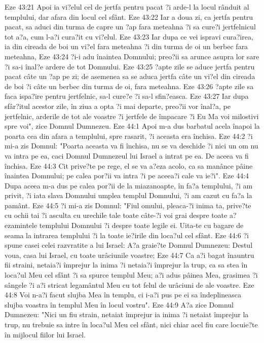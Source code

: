 Eze 43:21  Apoi ia vi?elul cel de jertfa pentru pacat ?i arde-l la locul rânduit al templului, dar afara din locul cel sfânt.
Eze 43:22  Iar a doua zi, ca jertfa pentru pacat, sa aduci din turma de capre un ?ap fara meteahna ?i sa cure?i jertfelnicul tot a?a, cum l-a?i cura?it cu vi?elul.
Eze 43:23  Iar dupa ce vei ispravi cura?irea, ia din cireada de boi un vi?el fara meteahna ?i din turma de oi un berbec fara meteahna,
Eze 43:24  ?i-i adu înaintea Domnului; preo?ii sa arunce asupra lor sare ?i sa-i înal?e ardere de tot Domnului.
Eze 43:25  ?apte zile se aduce jertfa pentru pacat câte un ?ap pe zi; de asemenea sa se aduca jertfa câte un vi?el din cireada de boi ?i câte un berbec din turma de oi, fara meteahna.
Eze 43:26  ?apte zile sa faca ispa?ire pentru jertfelnic, sa-l cure?e ?i sa-l sfin?easca.
Eze 43:27  Iar dupa sfâr?itul acestor zile, în ziua a opta ?i mai departe, preo?ii vor înal?a, pe jertfelnic, arderile de tot ale voastre ?i jertfele de împacare ?i Eu Ma voi milostivi spre voi", zice Domnul Dumnezeu.
Eze 44:1  Apoi m-a dus barbatul acela înapoi la poarta cea din afara a templului, spre rasarit, ?i aceasta era închisa.
Eze 44:2  ?i mi-a zis Domnul: "Poarta aceasta va fi închisa, nu se va deschide ?i nici un om nu va intra pe ea, caci Domnul Dumnezeul lui Israel a intrat pe ea. De aceea va fi închisa.
Eze 44:3  Cit prive?te pe rege, el se va a?eza acolo, ca sa manânce pâine înaintea Domnului; pe calea por?ii va intra ?i pe aceea?i cale va ie?i".
Eze 44:4  Dupa aceea m-a dus pe calea por?ii de la miazanoapte, în fa?a templului, ?i am privit, ?i iata slava Domnului umplea templul Domnului, ?i am cazut cu fa?a la pamânt.
Eze 44:5  ?i mi-a zis Domnul: "Fiul omului, pleaca-?i inima ta, prive?te cu ochii tai ?i asculta cu urechile tale toate câte-?i voi grai despre toate a?ezamintele templului Domnului ?i despre toate legile ei. Uita-te cu bagare de seama la intrarea templului ?i la toate ie?irile din loca?ul cel sfânt.
Eze 44:6  ?i spune casei celei razvratite a lui Israel: A?a graie?te Domnul Dumnezeu: Destul voua, casa lui Israel, cu toate urâciunile voastre;
Eze 44:7  Ca a?i bagat înauntru fii straini, netaia?i împrejur la inima ?i netaia?i împrejur la trup, ca sa stea în loca?ul Meu cel sfânt ?i sa spurce templul Meu; a?i adus pâinea Mea, grasimea ?i sângele ?i a?i stricat legamântul Meu cu tot felul de urâciuni de ale voastre.
Eze 44:8  Voi n-a?i facut slujba Mea în templu, ci i-a?i pus pe ei sa îndeplineasca slujba voastra în templul Meu în locul vostru".
Eze 44:9  A?a zice Domnul Dumnezeu: "Nici un fiu strain, netaiat împrejur ia inima ?i netaiat împrejur la trup, nu trebuie sa intre în loca?ul Meu cel sfânt, nici chiar acel fiu care locuie?te în mijlocul fiilor lui Israel.
